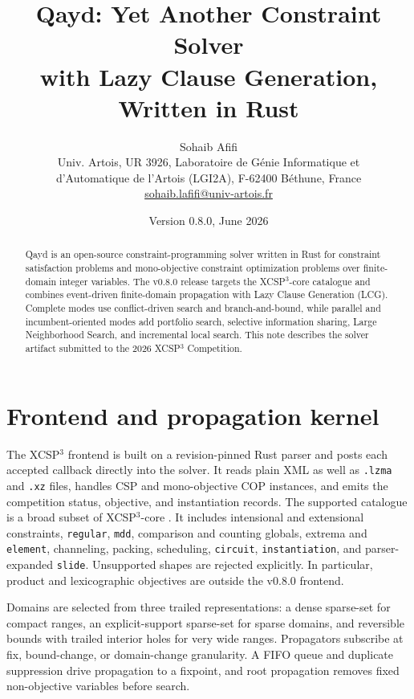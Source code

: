 \documentclass[10pt,letterpaper]{article}
\title{\vspace{-1.8em}\textbf{Qayd: Yet Another Constraint Solver\\
with Lazy Clause Generation, Written in Rust}\vspace{-0.4em}}
\author{Sohaib Afifi\\[-0.15em]
\small Univ. Artois, UR 3926, Laboratoire de G\'enie Informatique et\\[-0.15em]
\small d'Automatique de l'Artois (LGI2A), F-62400 B\'ethune, France\\[-0.15em]
\small \href{mailto:sohaib.lafifi@univ-artois.fr}{sohaib.lafifi@univ-artois.fr}}
\date{\small Version 0.8.0, June 2026\vspace{-1.0em}}
\begin{document}
\maketitle
\thispagestyle{empty}
\vspace{-1.3em}

\begin{abstract}
\noindent
Qayd is an open-source constraint-programming solver written in Rust for
constraint satisfaction problems and mono-objective constraint optimization
problems over finite-domain integer variables. The v0.8.0 release targets the
XCSP$^3$-core catalogue and combines event-driven finite-domain propagation
with Lazy Clause Generation (LCG). Complete modes use conflict-driven search
and branch-and-bound, while parallel and incumbent-oriented modes add
portfolio search, selective information sharing, Large Neighborhood Search,
and incremental local search. This note describes the solver artifact submitted
to the 2026 XCSP$^3$ Competition.
\end{abstract}

\section{Frontend and propagation kernel}

The XCSP$^3$ frontend is built on a revision-pinned Rust parser and posts each
accepted callback directly into the solver. It reads plain XML as well as
\texttt{.lzma} and \texttt{.xz} files, handles CSP and mono-objective COP
instances, and emits the competition status, objective, and instantiation
records. The supported catalogue is a broad subset of XCSP$^3$-core
\cite{xcsp3,xcsp3core}. It includes intensional and extensional constraints,
\texttt{regular}, \texttt{mdd}, comparison and counting globals, extrema and
\texttt{element}, channeling, packing, scheduling, \texttt{circuit},
\texttt{instantiation}, and parser-expanded \texttt{slide}. Unsupported shapes
are rejected explicitly. In particular, product and lexicographic objectives
are outside the v0.8.0 frontend.

Domains are selected from three trailed representations: a dense sparse-set for
compact ranges, an explicit-support sparse-set for sparse domains, and
reversible bounds with trailed interior holes for very wide ranges. Propagators
subscribe at fix, bound-change, or domain-change granularity. A FIFO queue and
duplicate suppression drive propagation to a fixpoint, and root propagation
removes fixed non-objective variables before search.
\end{document}
